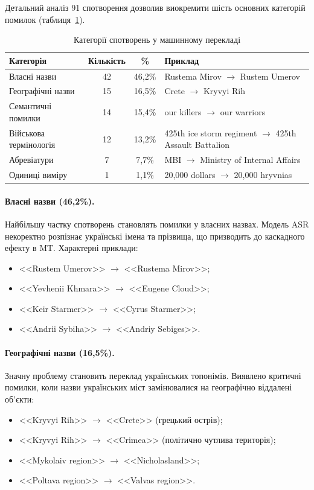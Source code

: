 Детальний аналіз 91 спотворення дозволив виокремити шість основних категорій
помилок (таблиця~\ref{tab:distortion_categories}).

\begin{table}[H]
\centering
\caption{Категорії спотворень у машинному перекладі}
\label{tab:distortion_categories}
\begin{tabular}{|l|c|c|p{5cm}|}
\hline
\textbf{Категорія} & \textbf{Кількість} & \textbf{\%} & \textbf{Приклад} \\
\hline
Власні назви & 42 & 46,2\% & Rustema Mirov $\rightarrow$ Rustem Umerov \\
Географічні назви & 15 & 16,5\% & Crete $\rightarrow$ Kryvyi Rih \\
Семантичні помилки & 14 & 15,4\% & our killers $\rightarrow$ our warriors \\
Військова термінологія & 12 & 13,2\% & 425th ice storm regiment $\rightarrow$ 425th Assault Battalion \\
Абревіатури & 7 & 7,7\% & MBI $\rightarrow$ Ministry of Internal Affairs \\
Одиниці виміру & 1 & 1,1\% & 20,000 dollars $\rightarrow$ 20,000 hryvnias \\
\hline
\end{tabular}
\end{table}

\paragraph{Власні назви (46,2\%).}
Найбільшу частку спотворень становлять помилки у власних назвах. Модель ASR
некоректно розпізнає українські імена та прізвища, що призводить до каскадного
ефекту в MT. Характерні приклади:
\begin{itemize}[nosep]
    \item <<Rustem Umerov>> $\rightarrow$ <<Rustema Mirov>>;
    \item <<Yevhenii Khmara>> $\rightarrow$ <<Eugene Cloud>>;
    \item <<Keir Starmer>> $\rightarrow$ <<Cyrus Starmer>>;
    \item <<Andrii Sybiha>> $\rightarrow$ <<Andriy Sebiges>>.
\end{itemize}

\paragraph{Географічні назви (16,5\%).}
Значну проблему становить переклад українських топонімів. Виявлено критичні
помилки, коли назви українських міст замінювалися на географічно віддалені
об'єкти:
\begin{itemize}[nosep]
    \item <<Kryvyi Rih>> $\rightarrow$ <<Crete>> (грецький острів);
    \item <<Kryvyi Rih>> $\rightarrow$ <<Crimea>> (політично чутлива територія);
    \item <<Mykolaiv region>> $\rightarrow$ <<Nicholasland>>;
    \item <<Poltava region>> $\rightarrow$ <<Valvas region>>.
\end{itemize}

